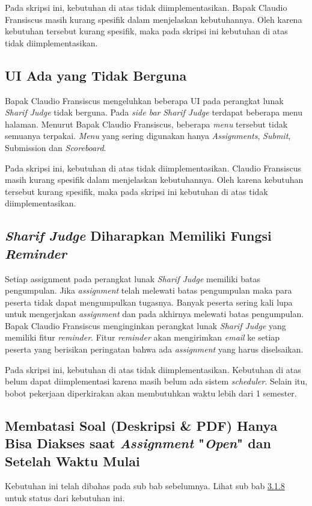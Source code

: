Pada skripsi ini, kebutuhan di atas tidak diimplementasikan. Bapak Claudio Fransiscus masih kurang spesifik dalam menjelaskan kebutuhannya. Oleh karena kebutuhan tersebut kurang spesifik, maka pada skripsi ini kebutuhan di atas tidak diimplementasikan.

\subsection{UI Ada yang Tidak Berguna}
Bapak Claudio Fransiscus mengeluhkan beberapa UI pada perangkat lunak \textit{Sharif Judge} tidak berguna. Pada \textit{side bar} \textit{Sharif Judge} terdapat beberapa menu halaman. Menurut Bapak Claudio Fransiscus, beberapa \textit{menu} tersebut tidak semuanya terpakai. \textit{Menu} yang sering digunakan hanya \textit{Assignments}, \textit{Submit}, Submission dan \textit{Scoreboard}.

Pada skripsi ini, kebutuhan di atas tidak diimplementasikan. Claudio Fransiscus masih kurang spesifik dalam menjelaskan kebutuhannya. Oleh karena kebutuhan tersebut kurang spesifik, maka pada skripsi ini kebutuhan di atas tidak diimplementasikan.

\subsection{\textit{Sharif Judge} Diharapkan Memiliki Fungsi \textit{Reminder}}
Setiap assignment pada perangkat lunak \textit{Sharif Judge} memiliki batas pengumpulan. Jika \textit{assignment} telah melewati batas pengumpulan maka para peserta tidak dapat mengumpulkan tugasnya. Banyak peserta sering kali lupa untuk mengerjakan \textit{assignment} dan pada akhirnya melewati batas pengumpulan. Bapak Claudio Fransiscus menginginkan perangkat lunak \textit{Sharif Judge} yang memiliki fitur \textit{reminder}. Fitur \textit{reminder} akan mengirimkan \textit{email} ke setiap peserta yang berisikan peringatan bahwa ada \textit{assignment} yang harus diselsaikan. 

Pada skripsi ini, kebutuhan di atas tidak diimplementasikan. Kebutuhan di atas belum dapat diimplementasi karena masih belum ada sistem \textit{scheduler}. Selain itu, bobot pekerjaan diperkirakan akan membutuhkan waktu lebih dari 1 semester.

\subsection{Membatasi Soal (Deskripsi \& PDF) Hanya Bisa Diakses saat \textit{Assignment} "\textit{Open}" dan Setelah Waktu Mulai}
Kebutuhan ini telah dibahas pada sub bab sebelumnya. Lihat sub bab \hyperref[subsec:membatasisoal]{3.1.8} untuk status dari kebutuhan ini.

